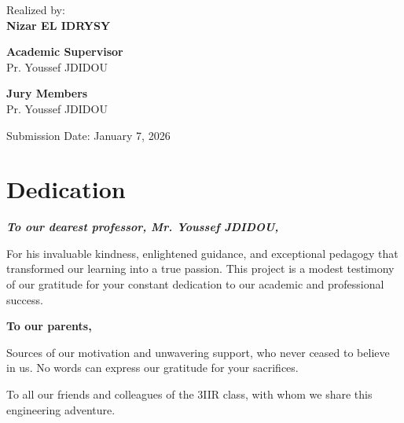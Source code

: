 \documentclass[12pt,a4paper]{report}
\begin{document}
\begin{titlepage}

\vspace{1cm}

{\large Realized by: }\\[0.2cm]
\textbf{
Nizar EL IDRYSY
}

\vspace{0.8cm}

\begin{flushleft}
\textbf{Academic Supervisor}\\
Pr. Youssef JDIDOU
\end{flushleft}

\vspace{0.6cm}

\begin{center}
\textbf{Jury Members}\\
Pr. Youssef JDIDOU
\end{center}

\vfill
\begin{center}
{\large Submission Date: January 7, 2026}
\end{center}

\vfill
\end{titlepage}

\chapter*{Dedication}
\vspace*{3cm}
\begin{center}
    \itshape\Large
    \textbf{To our dearest professor, Mr. Youssef JDIDOU,}
    
    \vspace{1cm}
    For his invaluable kindness, enlightened guidance, and exceptional pedagogy that transformed our learning into a true passion. This project is a modest testimony of our gratitude for your constant dedication to our academic and professional success.
    
    \vspace{1cm}
    \textbf{To our parents,}
    
    \vspace{0.5cm}
    Sources of our motivation and unwavering support, who never ceased to believe in us. No words can express our gratitude for your sacrifices.
    
    \vspace{1cm}
    To all our friends and colleagues of the 3IIR class, with whom we share this engineering adventure.
\end{center}
\vfill
\end{document}
